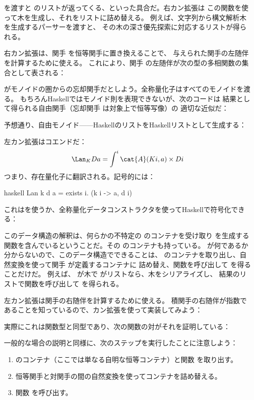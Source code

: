を渡すと  のリストが返ってくる、といった具合だ。右カン拡張は
この関数を使って木を生成し、それをリストに詰め替える。
例えば、文字列から構文解析木を生成するパーサーを渡すと、
その木の深さ優先探索に対応するリストが得られる。

右カン拡張は、関手  を恒等関手に置き換えることで、
与えられた関手の左随伴を計算するために使える。
これにより、関手  の左随伴が次の型の多相関数の集合として表される：

 がモノイドの圏からの忘却関手だとしよう。全称量化子はすべてのモノイドを渡る。
もちろんHaskellではモノイド則を表現できないが、次のコードは
結果として得られる自由関手（忘却関手  は対象上で恒等写像）の
適切な近似だ：

予想通り、自由モノイド——HaskellのリストをHaskellリストとして生成する：

左カン拡張はコエンドだ：
\[\Lan_{K}D a = \int^i \cat{A}(K i, a)\times{}D i\]
つまり、存在量化子に翻訳される。記号的には：

\begin{snip}{haskell}
Lan k d a = exists i. (k i -> a, d i)
\end{snip}
これはを使うか、全称量化データコンストラクタを使ってHaskellで符号化できる：

このデータ構造の解釈は、何らかの不特定の  のコンテナを受け取り
 を生成する関数を含んでいるということだ。その  のコンテナも持っている。
 が何であるか分からないので、このデータ構造でできることは、
 のコンテナを取り出し、自然変換を使って関手  が定義するコンテナに
詰め替え、関数を呼び出して  を得ることだけだ。
例えば、 が木で  がリストなら、木をシリアライズし、
結果のリストで関数を呼び出して  を得られる。

左カン拡張は関手の右随伴を計算するために使える。
積関手の右随伴が指数であることを知っているので、カン拡張を使って実装してみよう：

実際にこれは関数型と同型であり、次の関数の対がそれを証明している：

一般的な場合の説明と同様に、次のステップを実行したことに注意しよう：

\begin{enumerate}
  \tightlist
  \item
         のコンテナ（ここでは単なる自明な恒等コンテナ）と関数  を取り出す。
  \item
        恒等関手と対関手の間の自然変換を使ってコンテナを詰め替える。
  \item
        関数  を呼び出す。
\end{enumerate}

